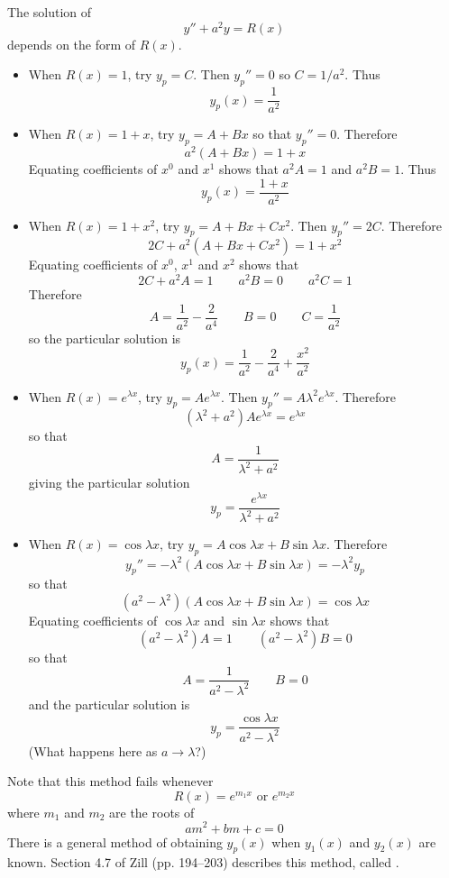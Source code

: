 \begin{example}
The solution of 
$$y''+a^2y=R(x)$$
depends on the form of $R(x)$.

\begin{itemize}
\item When $R(x)=1$, try $y_p=C$.  Then $y_p''=0$ so $C=1/a^2$.  Thus
$$y_p(x)=\frac{1}{a^2}$$

\item When $R(x)=1+x$, try $y_p=A+Bx$ so that $y_p''=0$.  Therefore
$$a^2(A+Bx)=1+x$$
Equating coefficients of $x^0$ and $x^1$ shows that $a^2A=1$ and $a^2B=1$. 
Thus
$$y_p(x)=\frac{1+x}{a^2}$$

\item When $R(x)=1+x^2$, try $y_p=A+Bx+Cx^2$.  Then $y_p''=2C$.
Therefore
$$2C+a^2(A+Bx+Cx^2)=1+x^2$$
Equating coefficients of $x^0$, $x^1$ and $x^2$ shows that
$$2C+a^2A=1\qquad a^2B=0\qquad a^2C=1$$
Therefore 
$$A=\frac{1}{a^2}-\frac{2}{a^4}\qquad B=0\qquad C=\frac{1}{a^2}$$
so the particular solution is
$$y_p(x)=\frac{1}{a^2}-\frac{2}{a^4}+\frac{x^2}{a^2}$$

\item When $R(x)=e^{\lambda x}$, try $y_p=Ae^{\lambda x}$.  Then
$y_p''=A\lambda^2e^{\lambda x}$.  Therefore
$$(\lambda^2+a^2)Ae^{\lambda x}=e^{\lambda x}$$
so that
$$A=\frac{1}{\lambda^2+a^2}$$
giving the particular solution
$$y_p=\frac{e^{\lambda x}}{\lambda^2+a^2}$$

\item When $R(x)=\cos\lambda x$, try $y_p=A\cos\lambda x+B\sin\lambda x$.
Therefore 
$$y_p''=-\lambda^2(A\cos\lambda x+B\sin\lambda x)=-\lambda^2 y_p$$
so that
$$(a^2-\lambda^2)(A\cos\lambda x+B\sin\lambda x)=\cos\lambda x$$
Equating coefficients of $\cos\lambda x$ and $\sin\lambda x$ shows that
$$(a^2-\lambda^2)A=1\qquad (a^2-\lambda^2)B=0$$
so that
$$A=\frac{1}{a^2-\lambda^2}\qquad B=0$$
and the particular solution is
$$y_p=\frac{\cos\lambda x}{a^2-\lambda^2}$$
(What happens here as $a\to\lambda$?)
\end{itemize}
\end{example}

Note that this method fails whenever
$$R(x)=e^{m_1x}\mbox{\ or\ } e^{m_2x}$$
where $m_1$ and $m_2$ are the roots of 
$$am^2+bm+c=0$$
There is a general method of obtaining $y_p(x)$ when $y_1(x)$ and
$y_2(x)$ are known.  Section 4.7 of Zill (pp. 194--203) describes this
method, called .

